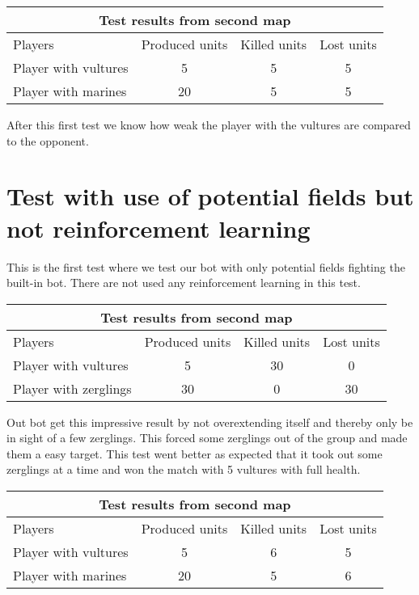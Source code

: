 \begin{centering}
\begin{table}
 \begin{tabular}{|l|c|c|c|}
	\multicolumn{4}{c}{Test results from second map} \\
	\hline
	Players & Produced units & Killed units & Lost units\\
	\hline
		Player with vultures & 5 & 5 & 5\\
	\hline
		Player with marines & 20 & 5 & 5\\
	\hline

\end{tabular}
\end{table}
\end{centering}

After this first test we know how weak the player with the vultures are compared to the opponent.
\newpage
\section{Test with use of potential fields but not reinforcement learning} %
This is the first test where we test our bot with only potential fields fighting the built-in bot. There are not used any reinforcement learning in this test.\\

\begin{centering}
 \begin{tabular}{|l|c|c|c|}
	\multicolumn{4}{c}{Test results from second map} \\
	\hline
	Players & Produced units & Killed units & Lost units\\
	\hline
	\hline
		Player with vultures & 5 & 30 & 0\\
	\hline
		Player with zerglings & 30 & 0 & 30\\
	\hline

\end{tabular}
\end{centering}

Out bot get this impressive result by not overextending itself and thereby only be in sight of a few zerglings. This forced some zerglings out of the group and made them a easy target. This test went better as expected that it took out some zerglings at a time and won the match with 5 vultures with full health.\\

\begin{centering}
 \begin{tabular}{|l|c|c|c|}
	\multicolumn{4}{c}{Test results from second map} \\
	\hline
	Players & Produced units & Killed units & Lost units\\
	\hline
	\hline
		Player with vultures & 5 & 6 & 5\\
	\hline
		Player with marines & 20 & 5 & 6\\
	\hline

\end{tabular}
\end{centering}


